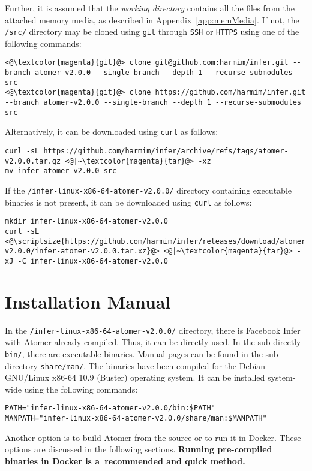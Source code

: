 Further, it is assumed that the \emph{working directory} contains all the files from the attached memory media, as described in Appendix~\ref{app:memMedia}. If not, the \texttt{/src/} directory may be cloned using \texttt{git} through \texttt{SSH} or \texttt{HTTPS} using one of the following commands:
\begin{lstlisting}[style=bash]
<@\textcolor{magenta}{git}@> clone git@github.com:harmim/infer.git --branch atomer-v2.0.0 --single-branch --depth 1 --recurse-submodules src
<@\textcolor{magenta}{git}@> clone https://github.com/harmim/infer.git --branch atomer-v2.0.0 --single-branch --depth 1 --recurse-submodules src
\end{lstlisting}
Alternatively, it can be downloaded using \texttt{curl} as follows:
\begin{lstlisting}[style=bash]
curl -sL https://github.com/harmim/infer/archive/refs/tags/atomer-v2.0.0.tar.gz <@|~\textcolor{magenta}{tar}@> -xz
mv infer-atomer-v2.0.0 src
\end{lstlisting}
If the \texttt{/infer-linux-x86-64-atomer-v2.0.0/} directory containing executable binaries is not present, it can be downloaded using \texttt{curl} as follows:
\begin{lstlisting}[style=bash]
mkdir infer-linux-x86-64-atomer-v2.0.0
curl -sL <@\scriptsize{https://github.com/harmim/infer/releases/download/atomer-v2.0.0/infer-atomer-v2.0.0.tar.xz}@> <@|~\textcolor{magenta}{tar}@> -xJ -C infer-linux-x86-64-atomer-v2.0.0
\end{lstlisting}


\section*{Installation Manual}

In the \texttt{/infer-linux-x86-64-atomer-v2.0.0/} directory, there is Facebook Infer with Atomer already compiled. Thus, it can be directly used. In the sub-directly \texttt{bin/}, there are executable binaries. Manual pages can be found in the sub-directory \texttt{share/man/}. The binaries have been compiled for the Debian GNU/Linux x86-64 10.9 (Buster) operating system. It can be installed system-wide using the following commands:
\begin{lstlisting}[style=bash]
PATH="infer-linux-x86-64-atomer-v2.0.0/bin:$PATH"
MANPATH="infer-linux-x86-64-atomer-v2.0.0/share/man:$MANPATH"
\end{lstlisting}

Another option is to build Atomer from the source or to run it in Docker. These options are discussed in the following sections. \textbf{Running pre-compiled binaries in Docker is a~recommended and quick method.}

